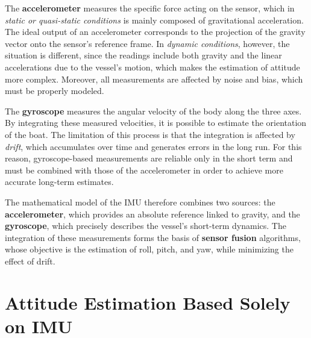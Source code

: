 The \textbf{accelerometer} measures the specific force acting on the sensor, which in \textit{static or quasi-static conditions} is mainly composed of gravitational acceleration. The ideal output of an accelerometer corresponds to the projection of the gravity vector onto the sensor’s reference frame. In \textit{dynamic conditions}, however, the situation is different, since the readings include both gravity and the linear accelerations due to the vessel’s motion, which makes the estimation of attitude more complex. Moreover, all measurements are affected by noise and bias, which must be properly modeled.

The \textbf{gyroscope} measures the angular velocity of the body along the three axes. By integrating these measured velocities, it is possible to estimate the orientation of the boat. The limitation of this process is that the integration is affected by \textit{drift}, which accumulates over time and generates errors in the long run. For this reason, gyroscope-based measurements are reliable only in the short term and must be combined with those of the accelerometer in order to achieve more accurate long-term estimates.

The mathematical model of the IMU therefore combines two sources: the \textbf{accelerometer}, which provides an absolute reference linked to gravity, and the \textbf{gyroscope}, which precisely describes the vessel’s short-term dynamics. The integration of these measurements forms the basis of \textbf{sensor fusion} algorithms, whose objective is the estimation of roll, pitch, and yaw, while minimizing the effect of drift.

\section{Attitude Estimation Based Solely on IMU}

